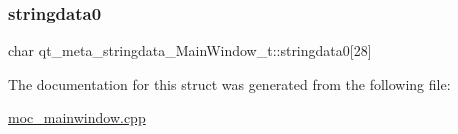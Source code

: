 \subsubsection{\texorpdfstring{stringdata0}{stringdata0}}
{\footnotesize\ttfamily char qt\+\_\+meta\+\_\+stringdata\+\_\+\+Main\+Window\+\_\+t\+::stringdata0\mbox{[}28\mbox{]}}



The documentation for this struct was generated from the following file\+:\begin{DoxyCompactItemize}
\item 
\mbox{\hyperlink{moc__mainwindow_8cpp}{moc\+\_\+mainwindow.\+cpp}}\end{DoxyCompactItemize}
